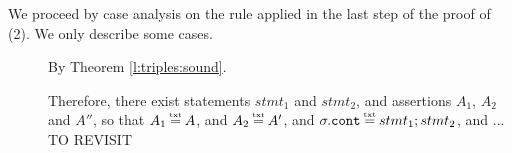  \vspace{.2cm}
\noindent
We proceed by case analysis on the  rule applied in the last step of the proof of (2). We only describe some cases.

\begin{description} 
 
 \item[{}] 
 
 By Theorem \ref{l:triples:sound}.

\newcommand{\SPS}{\strut \ \ \hspace{0.5cm} \ \ }
 
\item[{}] 
Therefore, there exist statements $stmt_1$ and $stmt_2$, and assertions  $A_1$, $A_2$ and $A''$, so that $A_1\txteq A$, and $A_2 \txteq A'$, and $\sigma.\prg{cont}\txteq  stmt_1; stmt_2$, and ... TO REVISIT
%
%

\end{description}
